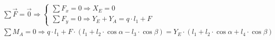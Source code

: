 \documentclass[preview]{standalone}
\begin{document}
\begin{align*}
\sum \Vec{F} = \Vec{0} \Longrightarrow \left\{\begin{array}{lc}\sum F_x = 0 \Longrightarrow X_E = 0 \\\sum F_y = 0 \Longrightarrow Y_E + Y_A = q\cdot l_1 + F \end{array}\right. \\ \sum M_A = 0 \Longrightarrow q\cdot l_1 + F\cdot (l_1+l_2\cdot \cos{\alpha}-l_3\cdot \cos{\beta}) = Y_E \cdot (l_1 + l_2\cdot\cos{\alpha} + l_4\cdot\cos{\beta})
\end{align*}
\end{document}
